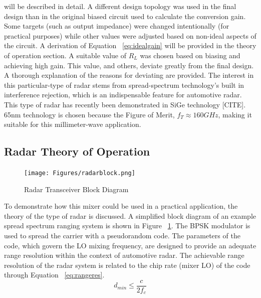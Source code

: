 \documentclass{article}                                                         %
\begin{document}
will be described in detail. A different design topology was used in the final design than in the original biased circuit used to calculate
the conversion gain. Some targets (such as output impedance) were changed intentionally (for practical purposes) while other values
were adjusted based on non-ideal aspects of the circuit.\vspace{3mm}
A derivation of Equation ~\ref{eq:idealgain} will be provided in the theory of operation section. A suitable value of $R_L$ was chosen
based on biasing and achieving high gain. This value, and others, deviate greatly from the final design. A thorough explanation of the
reasons for deviating are provided.
The interest in this particular-type of radar stems from spread-spectrum technology's built in interference rejection, which
is an indispensable feature for automotive radar. This type of radar has recently been demonstrated in
SiGe technology [CITE]. 65nm technology is chosen because the Figure of Merit, $f_T \approx 160GHz $, making it suitable for
this millimeter-wave application.

\subsection{Radar Theory of Operation}

\begin{figure}
  \begin{center}
    \texttt{[image: Figures/radarblock.png]}
    \caption{Radar Transceiver Block Diagram}
    \label{fig:radartrans}
  \end{center}
\end{figure}
To demonstrate how this mixer could be used in a practical application, the theory of the type of radar is discussed.
A simplified block diagram of an example spread spectrum ranging system is shown in Figure ~\ref{fig:radartrans}.
The BPSK modulator is used to spread the carrier with a pseudorandom code. The parameters of the code, which govern
the LO mixing frequency, are designed to provide an adequate range resolution within the context of automotive radar.
The achievable range resolution of the radar system is related to the chip rate (mixer LO) of the code through
Equation ~\ref{eq:rangeres}.\\

\begin{equation}
  \label{eq:rangeres}
  d_{min} \leq \dfrac{c}{2f_c}
\end{equation}
\end{document}
